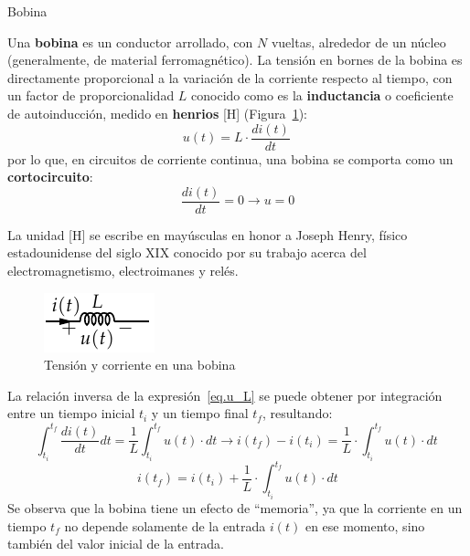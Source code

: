 \documentclass[11pt]{book} %
\makeatletter
\numberwithin{dummy}{section}
\theoremstyle{ocrenumbox}
\theoremstyle{blacknumex}
\theoremstyle{blacknumbox}
\theoremstyle{ocrenum}
\newenvironment{remark}{\par\vspace{10pt}\small %
\begin{list}{}{
\leftmargin=35pt %
\rightmargin=25pt}\item\ignorespaces %
\makebox[-2.5pt]{\begin{tikzpicture}[overlay]
\node[draw=ocre!60,line width=1pt,circle,fill=ocre!25,font=\sffamily\bfseries,inner sep=2pt,outer sep=0pt] at (-15pt,0pt){\textcolor{ocre}{N}};\end{tikzpicture}} %
\advance\baselineskip -1pt}{\end{list}\vskip5pt} %
\renewcommand{\subsubsection}{\@startsection {subsubsection}{3}{\z@}
{-2ex \@plus -0.1ex \@minus -.2ex}
{.2ex \@plus.2ex }
{\normalfont\small\sffamily\bfseries}}
\newlength\esp
\makeatother
\begin{document}
	\subsubsection{Bobina}\label{sec.bobina}
	
	Una \textbf{bobina} es un conductor arrollado, con $N$ vueltas, alrededor de un núcleo (generalmente, de material ferromagnético). La tensión en bornes de la bobina es directamente proporcional a la variación de la corriente respecto al tiempo, con un factor de proporcionalidad $L$ conocido como es la \textbf{inductancia} o coeficiente de autoinducción, medido en \textbf{henrios} [H] (Figura~\ref{fig.bobina}):
	\begin{equation}\label{eq.u_L}
		\boxed{u(t)=L\cdot\frac{di(t)}{dt}}\,
	\end{equation}
	por lo que, en circuitos de corriente continua, una bobina se comporta como un \textbf{cortocircuito}:
	\begin{equation*}
		\dfrac{di(t)}{dt} = 0 \rightarrow u = 0
	\end{equation*}
	\begin{remark}
		La unidad [H] se escribe en mayúsculas en honor a Joseph Henry, físico estadounidense del siglo XIX conocido por su trabajo acerca del electromagnetismo, electroimanes y relés.
	\end{remark}
	\begin{figure}[htbp]
		\centering
		\includegraphics[width=0.15\linewidth]{../figs/Bobina.pdf}
		\caption{Tensión y corriente en una bobina}
		\label{fig.bobina}
	\end{figure}
	
	La relación inversa de la expresión~\eqref{eq.u_L} se puede obtener por integración entre un tiempo inicial $t_i$ y un tiempo final $t_f$, resultando:
	\begin{equation*}
		\int_{t_i}^{t_f} \dfrac{di(t)}{dt}dt=\dfrac{1}{L}\int_{t_i}^{t_f}u(t)\cdot dt \rightarrow i(t_f)-i(t_i)=\dfrac{1}{L}\cdot\int_{t_i}^{t_f} u(t)\cdot dt\,
	\end{equation*}
	\begin{equation}
		\boxed{i(t_f)=i(t_i)+\dfrac{1}{L}\cdot\int_{t_i}^{t_f} u(t)\cdot dt}
	\end{equation}
	Se observa que la bobina tiene un efecto de ``memoria'', ya que la corriente en un tiempo $t_f$ no depende solamente de la entrada $i(t)$ en ese momento, sino también del valor inicial de la entrada.
	
\end{document}
